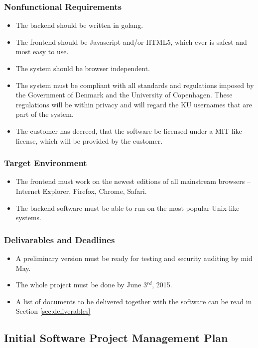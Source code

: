 \documentclass[11pt,a4paper]{report}
\begin{document}
\subsubsection{Nonfunctional Requirements}
\begin{itemize}
\item The backend should be written in golang.
\item The frontend should be Javascript and/or HTML5, which ever is safest and most easy to use.
\item The system should be browser independent.
\item The system must be compliant with all standards and regulations imposed by the Government of Denmark and the University of Copenhagen. These regulations will be within privacy and will regard the KU usernames that are part of the system.
\item The customer has decreed, that the software be licensed under a MIT-like license, which will be provided by the customer.
\end{itemize}
\subsubsection{Target Environment}
\begin{itemize}
\item The frontend must work on the newest editions of all mainstream browsers -- Internet Explorer, Firefox, Chrome, Safari.
\item The backend software must be able to run on the most popular Unix-like systems.
\end{itemize}
\subsubsection{Delivarables and Deadlines}\label{sec:deadlines}
\begin{itemize}
\item A preliminary version must be ready for testing and security auditing by mid May.
\item The whole project must be done by June 3$^{rd}$, 2015.
\item A list of documents to be delivered together with the software can be read in Section \ref{sec:deliverables}
\end{itemize}
\subsection{Initial Software Project Management Plan}
\end{document}
